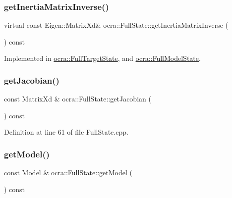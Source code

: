 \subsubsection{\texorpdfstring{get\+Inertia\+Matrix\+Inverse()}{getInertiaMatrixInverse()}}
{\footnotesize\ttfamily virtual const Eigen\+::\+Matrix\+Xd\& ocra\+::\+Full\+State\+::get\+Inertia\+Matrix\+Inverse (\begin{DoxyParamCaption}{ }\end{DoxyParamCaption}) const\hspace{0.3cm}{\ttfamily [pure virtual]}}



Implemented in \hyperlink{classocra_1_1FullTargetState_a55194b2f5683696eeee538cb93f3403a}{ocra\+::\+Full\+Target\+State}, and \hyperlink{classocra_1_1FullModelState_adf7ce7128a112c3f2b6367b6c0f6b9a2}{ocra\+::\+Full\+Model\+State}.

\hypertarget{classocra_1_1FullState_ada4a4e3af758b4af2ba95516eaad74e1}{}\label{classocra_1_1FullState_ada4a4e3af758b4af2ba95516eaad74e1} 
\subsubsection{\texorpdfstring{get\+Jacobian()}{getJacobian()}}
{\footnotesize\ttfamily const Matrix\+Xd \& ocra\+::\+Full\+State\+::get\+Jacobian (\begin{DoxyParamCaption}{ }\end{DoxyParamCaption}) const}



Definition at line 61 of file Full\+State.\+cpp.

\hypertarget{classocra_1_1FullState_a97f2718a0f72e69c829d67db4514af68}{}\label{classocra_1_1FullState_a97f2718a0f72e69c829d67db4514af68} 
\subsubsection{\texorpdfstring{get\+Model()}{getModel()}}
{\footnotesize\ttfamily const Model \& ocra\+::\+Full\+State\+::get\+Model (\begin{DoxyParamCaption}{ }\end{DoxyParamCaption}) const}



